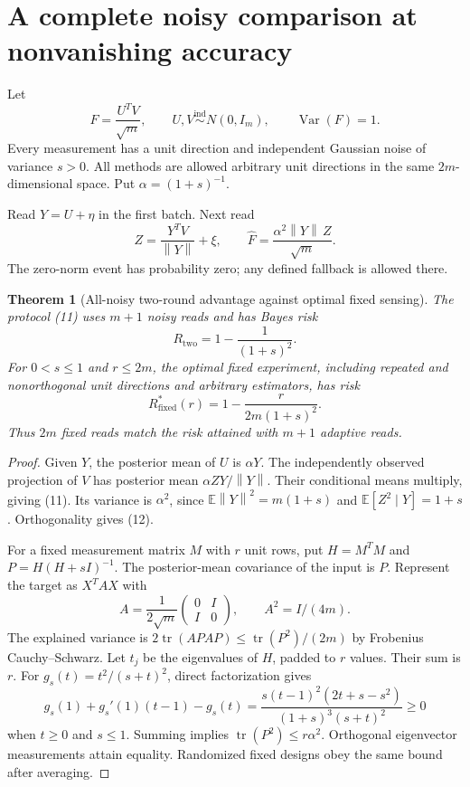 \documentclass[11pt,a4paper]{article}
\newcommand{\E}{\mathbb E}\newcommand{\Var}{\operatorname{Var}}
\newcommand{\tr}{\operatorname{tr}}\newcommand{\rank}{\operatorname{rank}}
\newcommand{\norm}[1]{\left\lVert#1\right\rVert}
\newtheorem{theorem}{Theorem}\newtheorem{lemma}[theorem]{Lemma}
\begin{document}
\section{A complete noisy comparison at nonvanishing accuracy}

Let
\[
 F=\frac{U^TV}{\sqrt m},\qquad U,V\stackrel{\mathrm{ind}}\sim N(0,I_m),
 \qquad \Var(F)=1.
\]
Every measurement has a unit direction and independent Gaussian noise of variance $s>0$. All methods are allowed arbitrary unit directions in the same $2m$-dimensional space. Put $\alpha=(1+s)^{-1}$.

Read $Y=U+\eta$ in the first batch. Next read
\[
 Z=\frac{Y^TV}{\norm Y}+\xi,
 \qquad \widehat F=\frac{\alpha^2\norm Y\,Z}{\sqrt m}. \tag{11}
\]
The zero-norm event has probability zero; any defined fallback is allowed there.

\begin{theorem}[All-noisy two-round advantage against optimal fixed sensing]\label{thm:noisy}
The protocol (11) uses $m+1$ noisy reads and has Bayes risk
\[
 R_{\mathrm{two}}=1-\frac1{(1+s)^2}. \tag{12}
\]
For $0<s\le1$ and $r\le2m$, the optimal fixed experiment, including repeated and nonorthogonal unit directions and arbitrary estimators, has risk
\[
 \boxed{R^*_{\mathrm{fixed}}(r)=1-\frac{r}{2m(1+s)^2}.} \tag{13}
\]
Thus $2m$ fixed reads match the risk attained with $m+1$ adaptive reads.
\end{theorem}
\begin{proof}
Given $Y$, the posterior mean of $U$ is $\alpha Y$. The independently observed projection of $V$ has posterior mean $\alpha ZY/\norm Y$. Their conditional means multiply, giving (11). Its variance is $\alpha^2$, since $\E\norm Y^2=m(1+s)$ and $\E[Z^2\mid Y]=1+s$. Orthogonality gives (12).

For a fixed measurement matrix $M$ with $r$ unit rows, put $H=M^TM$ and $P=H(H+sI)^{-1}$. The posterior-mean covariance of the input is $P$. Represent the target as $X^TAX$ with
\[
 A=\frac1{2\sqrt m}\begin{pmatrix}0&I\\I&0\end{pmatrix},
 \qquad A^2=I/(4m).
\]
The explained variance is $2\tr(APAP)\le\tr(P^2)/(2m)$ by Frobenius Cauchy--Schwarz. Let $t_j$ be the eigenvalues of $H$, padded to $r$ values. Their sum is $r$. For $g_s(t)=t^2/(s+t)^2$, direct factorization gives
\[
 g_s(1)+g_s'(1)(t-1)-g_s(t)
 =\frac{s(t-1)^2(2t+s-s^2)}{(1+s)^3(s+t)^2}\ge0 \tag{14}
\]
when $t\ge0$ and $s\le1$. Summing implies $\tr(P^2)\le r\alpha^2$. Orthogonal eigenvector measurements attain equality. Randomized fixed designs obey the same bound after averaging.
\end{proof}
\end{document}
